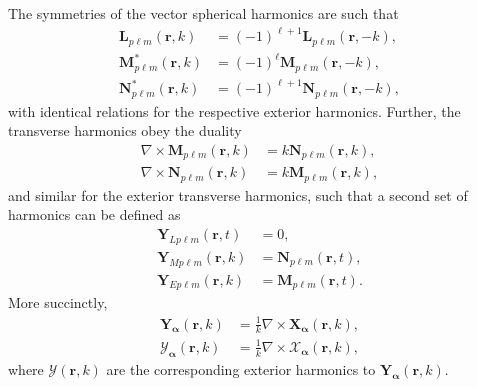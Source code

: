 The symmetries of the vector spherical harmonics are such that
\begin{equation}
\begin{split}
\mathbf{L}_{p\ell m}(\mathbf{r},k) &= (-1)^{\ell+1}\mathbf{L}_{p\ell m}(\mathbf{r},-k),\\
\mathbf{M}_{p\ell m}^*(\mathbf{r},k) &= (-1)^\ell\mathbf{M}_{p\ell m}(\mathbf{r},-k),\\
\mathbf{N}_{p\ell m}^*(\mathbf{r},k) &= (-1)^{\ell + 1}\mathbf{N}_{p\ell m}(\mathbf{r},-k),
\end{split}
\end{equation}
with identical relations for the respective exterior harmonics. Further, the transverse harmonics obey the duality
\begin{equation}
\begin{split}
\nabla\times\mathbf{M}_{p\ell m}(\mathbf{r},k) &= k\mathbf{N}_{p\ell m}(\mathbf{r},k),\\
\nabla\times\mathbf{N}_{p\ell m}(\mathbf{r},k) &= k\mathbf{M}_{p\ell m}(\mathbf{r},k),
\end{split}
\end{equation}
and similar for the exterior transverse harmonics, such that a second set of harmonics can be defined as 
\begin{equation}
\begin{split}
\mathbf{Y}_{Lp\ell m}(\mathbf{r},t) &= 0,\\
\mathbf{Y}_{Mp\ell m}(\mathbf{r},k) &= \mathbf{N}_{p\ell m}(\mathbf{r},t),\\
\mathbf{Y}_{Ep\ell m}(\mathbf{r},k) &= \mathbf{M}_{p\ell m}(\mathbf{r},t).
\end{split}
\end{equation}
More succinctly,
\begin{equation}
\begin{split}
\mathbf{Y}_{\bm{\alpha}}(\mathbf{r},k) &= \frac{1}{k}\nabla\times\mathbf{X}_{\bm{\alpha}}(\mathbf{r},k),\\
\bm{\mathcal{Y}}_{\bm{\alpha}}(\mathbf{r},k) &= \frac{1}{k}\nabla\times\bm{\mathcal{X}}_{\bm{\alpha}}(\mathbf{r},k),
\end{split}
\end{equation}
where $\bm{\mathcal{Y}}(\mathbf{r},k)$ are the corresponding exterior harmonics to $\mathbf{Y}_{\bm{\alpha}}(\mathbf{r},k)$.

